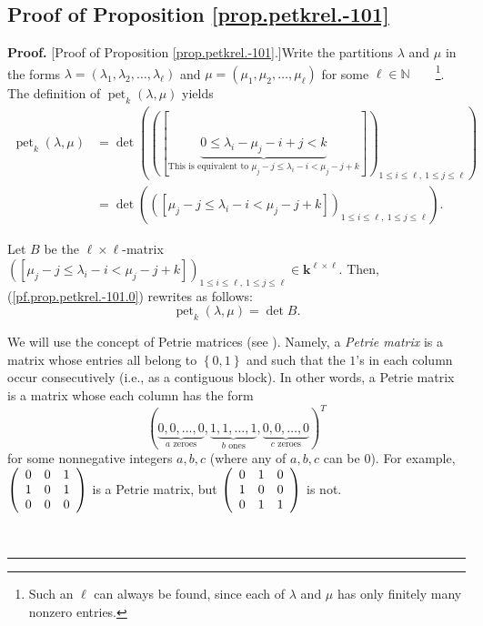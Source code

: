 \documentclass[numbers=enddot,12pt,final,onecolumn,notitlepage]{scrartcl}%
\theoremstyle{definition}
\newenvironment{proof}[1][Proof]{\noindent\textbf{#1.} }{\ \rule{0.5em}{0.5em}}
\begin{document}
\subsection{\label{subsect.proofs.petk.-101}Proof of Proposition
\ref{prop.petkrel.-101}}

\begin{proof}
[Proof of Proposition \ref{prop.petkrel.-101}.]Write the partitions $\lambda$
and $\mu$ in the forms $\lambda=\left(  \lambda_{1},\lambda_{2},\ldots
,\lambda_{\ell}\right)  $ and $\mu=\left(  \mu_{1},\mu_{2},\ldots,\mu_{\ell
}\right)  $ for some $\ell\in\mathbb{N}$\ \ \ \ \footnote{Such an $\ell$ can
always be found, since each of $\lambda$ and $\mu$ has only finitely many
nonzero entries.}. The definition of $\operatorname*{pet}\nolimits_{k}\left(
\lambda,\mu\right)  $ yields
\begin{align}
\operatorname*{pet}\nolimits_{k}\left(  \lambda,\mu\right)   &  =\det\left(
\left(  \left[  \underbrace{0\leq\lambda_{i}-\mu_{j}-i+j<k}_{\text{This is
equivalent to }\mu_{j}-j\leq\lambda_{i}-i<\mu_{j}-j+k}\right]  \right)
_{1\leq i\leq\ell,\ 1\leq j\leq\ell}\right) \nonumber\\
&  =\det\left(  \left(  \left[  \mu_{j}-j\leq\lambda_{i}-i<\mu_{j}-j+k\right]
\right)  _{1\leq i\leq\ell,\ 1\leq j\leq\ell}\right)  .
\label{pf.prop.petkrel.-101.0}%
\end{align}


Let $B$ be the $\ell\times\ell$-matrix $\left(  \left[  \mu_{j}-j\leq
\lambda_{i}-i<\mu_{j}-j+k\right]  \right)  _{1\leq i\leq\ell,\ 1\leq j\leq
\ell}\in\mathbf{k}^{\ell\times\ell}$. Then, (\ref{pf.prop.petkrel.-101.0})
rewrites as follows:%
\begin{equation}
\operatorname*{pet}\nolimits_{k}\left(  \lambda,\mu\right)  =\det B.
\label{pf.prop.petkrel.-101.=detB}%
\end{equation}


We will use the concept of Petrie matrices (see \cite[Theorem 1]{GorWil74}).
Namely, a \emph{Petrie matrix} is a matrix whose entries all belong to
$\left\{  0,1\right\}  $ and such that the $1$'s in each column occur
consecutively (i.e., as a contiguous block). In other words, a Petrie matrix
is a matrix whose each column has the form
\begin{equation}
\left(  \underbrace{0,0,\ldots,0}_{a\text{ zeroes}},\underbrace{1,1,\ldots
,1}_{b\text{ ones}},\underbrace{0,0,\ldots,0}_{c\text{ zeroes}}\right)  ^{T}
\label{pf.prop.petk.-101.petcol}%
\end{equation}
for some nonnegative integers $a,b,c$ (where any of $a,b,c$ can be $0$). For
example, $\left(
\begin{array}
[c]{ccc}%
0 & 0 & 1\\
1 & 0 & 1\\
0 & 0 & 0
\end{array}
\right)  $ is a Petrie matrix, but $\left(
\begin{array}
[c]{ccc}%
0 & 1 & 0\\
1 & 0 & 0\\
0 & 1 & 1
\end{array}
\right)  $ is not.


\end{proof}
\end{document}
